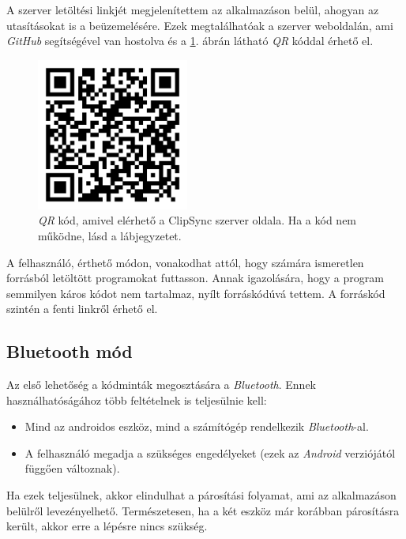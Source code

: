 \documentclass[12pt,a4paper]{article}
\begin{document}
	A szerver letöltési linkjét megjelenítettem az alkalmazáson belül, ahogyan az utasításokat is a beüzemelésére. Ezek megtalálhatóak a szerver weboldalán, ami \textit{GitHub} segítségével van hostolva és a \ref{qr_clipsync}. ábrán látható \textit{QR} kóddal érhető el.

	\begin{figure}[h!]
		\centering
		\includegraphics[width=5cm]{clipsync_server_qr}
		\caption[ClipSync szerver caption.]{\textit{QR} kód, amivel elérhető a ClipSync szerver oldala. Ha a kód nem működne, lásd a lábjegyzetet\footnotemark.}
		\label{qr_clipsync}
	\end{figure}

	A felhasználó, érthető módon, vonakodhat attól, hogy számára ismeretlen forrásból letöltött programokat futtasson. Annak igazolására, hogy a program semmilyen káros kódot nem tartalmaz, nyílt forráskódúvá tettem. A forráskód szintén a fenti linkről érhető el.
	
	\subsection{Bluetooth mód}
	
	Az első lehetőség a kódminták megosztására a \textit{Bluetooth}. Ennek használhatóságához több feltételnek is teljesülnie kell:
	
	\begin{itemize}
		\item Mind az androidos eszköz, mind a számítógép rendelkezik \textit{Bluetooth}-al.
		\item A felhasználó megadja a szükséges engedélyeket (ezek az \textit{Android} verziójától függően változnak).
	\end{itemize}

	Ha ezek teljesülnek, akkor elindulhat a párosítási folyamat, ami az alkalmazáson belülről levezényelhető. Természetesen, ha a két eszköz már korábban párosításra 
	került, akkor erre a lépésre nincs szükség.
	
\end{document}
